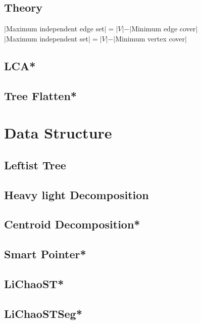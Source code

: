 \subsection{Theory}
\begin{footnotesize}
$|$Maximum independent edge set$|=|V|-|$Minimum edge cover$|$\\
$|$Maximum independent set$|=|V|-|$Minimum vertex cover$|$\\
\end{footnotesize}
\subsection{LCA*}

\subsection{Tree Flatten*}



\section{Data Structure}
\subsection{Leftist Tree}

\subsection{Heavy light Decomposition}

\subsection{Centroid Decomposition*} %

\subsection{Smart Pointer*}

\subsection{LiChaoST*}

\subsection{LiChaoSTSeg*}

